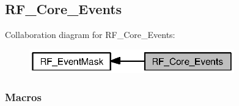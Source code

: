 \subsection{R\+F\+\_\+\+Core\+\_\+\+Events}
\label{group___r_f___core___events}
Collaboration diagram for R\+F\+\_\+\+Core\+\_\+\+Events\+:
\nopagebreak
\begin{figure}[H]
\begin{center}
\leavevmode
\includegraphics[width=251pt]{group___r_f___core___events}
\end{center}
\end{figure}
\subsubsection*{Macros}
